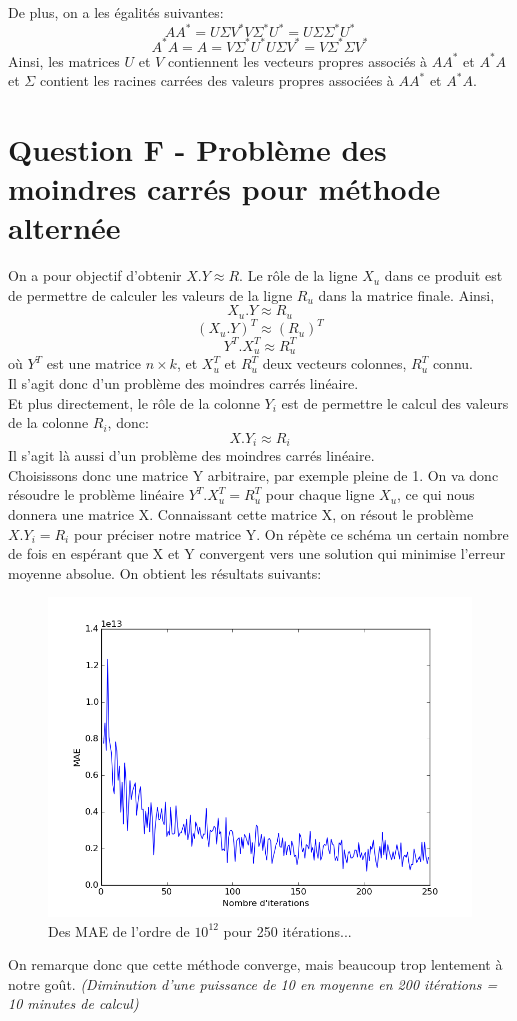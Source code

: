 \documentclass[12pt,a4paper]{article}
\begin{document}
De plus, on a les égalités suivantes:
$$ AA^*= U \Sigma V^{*} V \Sigma^* U^*  =U\Sigma\Sigma^*U^* $$
$$ A^*A= A= V \Sigma^* U^* U \Sigma V^{*} = V \Sigma^* \Sigma V^*$$
Ainsi, les matrices $U$ et $V$ contiennent les vecteurs propres associés à $AA^*$ et $A^*A$ et $\Sigma$ contient les racines carrées des valeurs propres associées à $AA^*$ et $A^*A$.

\newpage
\section{Question F - Problème des moindres carrés pour méthode alternée}
On a pour objectif d'obtenir $X.Y\approx R$. Le rôle de la ligne $X_u$ dans ce produit est de permettre de calculer les valeurs de la ligne $R_u$ dans la matrice finale. Ainsi, 
$$X_u.Y\approx R_u$$
$$(X_u.Y)^T\approx (R_u)^T$$
$$Y^T.X_u^T\approx R_u^T$$
où $Y^T$ est une matrice $n\times k$, et $X_u^T$ et $R_u^T$ deux vecteurs colonnes, $R_u^T$ connu. \\
Il s'agit donc d'un problème des moindres carrés linéaire.\\

Et plus directement, le rôle de la colonne $Y_i$ est de permettre le calcul des valeurs de la colonne $R_i$, donc:
$$X.Y_i \approx R_i$$
Il s'agit là aussi d'un problème des moindres carrés linéaire.\\

Choisissons donc une matrice Y arbitraire, par exemple pleine de 1. On va donc résoudre le problème linéaire $Y^T.X_u^T= R_u^T$ pour chaque ligne $X_u$, ce qui nous donnera une matrice X. Connaissant cette matrice X, on résout le problème $X.Y_i = R_i$ pour préciser notre matrice Y. On répète ce schéma un certain nombre de fois en espérant que X et Y convergent vers une solution qui minimise l'erreur moyenne absolue. On obtient les résultats suivants:

\begin{figure}[h]
\centering
\includegraphics[scale=0.5]{least-squares-MAE.png}
\caption{Des MAE de l'ordre de $10^{12}$ pour 250 itérations...}
\end{figure}
On remarque donc que cette méthode converge, mais beaucoup trop lentement à notre goût. \textit{(Diminution d'une puissance de 10 en moyenne en 200 itérations = 10 minutes de calcul)}
\end{document}
